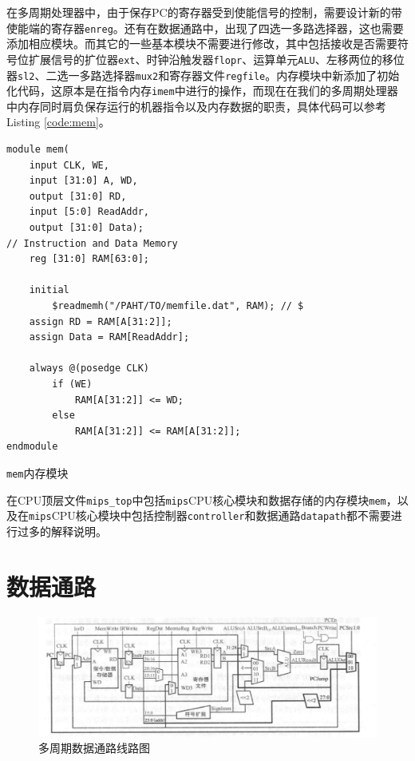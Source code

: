 \documentclass[12pt,a4paper]{article}
\newcommand{\incode}[1]{\texttt{#1}} %
\begin{document}
在多周期处理器中，由于保存PC的寄存器受到使能信号的控制，需要设计新的带使能端的寄存器\incode{enreg}。还有在数据通路中，出现了四选一多路选择器，这也需要添加相应模块。而其它的一些基本模块不需要进行修改，其中包括接收是否需要符号位扩展信号的扩位器\incode{ext}、时钟沿触发器\incode{flopr}、运算单元\incode{ALU}、左移两位的移位器\incode{sl2}、二选一多路选择器\incode{mux2}和寄存器文件\incode{regfile}。内存模块中新添加了初始化代码，这原本是在指令内存\incode{imem}中进行的操作，而现在在我们的多周期处理器中内存同时肩负保存运行的机器指令以及内存数据的职责，具体代码可以参考Listing \ref{code:mem}。

\begin{listing}[ht]
    \begin{verbatim}
module mem(
    input CLK, WE,
    input [31:0] A, WD,
    output [31:0] RD,
    input [5:0] ReadAddr,
    output [31:0] Data);
// Instruction and Data Memory
    reg [31:0] RAM[63:0];

    initial
        $readmemh("/PAHT/TO/memfile.dat", RAM); // $
    assign RD = RAM[A[31:2]];
    assign Data = RAM[ReadAddr];

    always @(posedge CLK)
        if (WE)
            RAM[A[31:2]] <= WD;
        else
            RAM[A[31:2]] <= RAM[A[31:2]];
endmodule
	\end{verbatim}
	\caption{\incode{mem}内存模块}
	\label{code:mem}
\end{listing}

在CPU顶层文件\incode{mips_top}中包括\incode{mips}CPU核心模块和数据存储的内存模块\incode{mem}，以及在\incode{mips}CPU核心模块中包括控制器\incode{controller}和数据通路\incode{datapath}都不需要进行过多的解释说明。

\section{数据通路}

\begin{figure}[h]
	\centering
	\includegraphics[width=\textwidth]{datapath}
	\caption{多周期数据通路线路图}
	\label{fig:datapath}
\end{figure}
\end{document}
